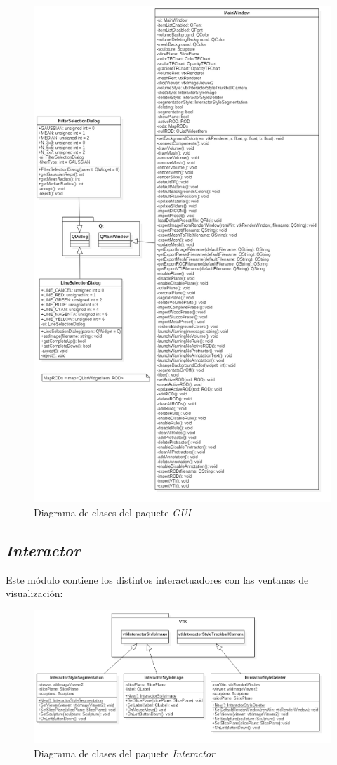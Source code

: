 \begin{figure}[H]
	\centering
	\includegraphics[width=12cm]{imagenes/diseno/gui}
	\caption{Diagrama de clases del paquete \textit{GUI}}
	\label{fig:diseno/gui}
\end{figure}

\subsection{\textit{Interactor}}

Este módulo contiene los distintos interactuadores con las ventanas de visualización: 

\begin{figure}[H]
	\centering
	\includegraphics[width=12cm]{imagenes/diseno/interactor}
	\caption{Diagrama de clases del paquete \textit{Interactor}}
	\label{fig:diseno/interactor}
\end{figure}

